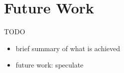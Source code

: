 \chapter{Future Work}
\label{chap:future}

TODO

\begin{itemize}
\item brief summary of what is achieved
\item future work: speculate
\end{itemize}